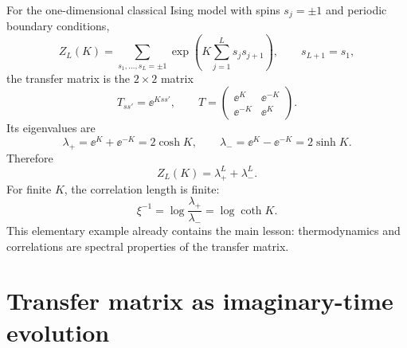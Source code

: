For the one-dimensional classical Ising model with spins $s_j=\pm1$ and periodic
boundary conditions,
\begin{equation}
\label{eq:classical-ising-1d-partition-function}
    Z_L(K)
    =
    \sum_{s_1,\ldots,s_L=\pm1}
    \exp\left(K\sum_{j=1}^{L}s_js_{j+1}\right),
    \qquad
    s_{L+1}=s_1,
\end{equation}
the transfer matrix is the $2\times2$ matrix
\begin{equation}
\label{eq:1d-ising-transfer-matrix}
    T_{ss'}=\ee^{Kss'},
    \qquad
    T=
    \begin{pmatrix}
        \ee^K & \ee^{-K} \\
        \ee^{-K} & \ee^K
    \end{pmatrix}.
\end{equation}
Its eigenvalues are
\begin{equation}
\label{eq:1d-ising-transfer-eigenvalues}
    \lambda_+=\ee^K+\ee^{-K}=2\cosh K,
    \qquad
    \lambda_- =\ee^K-\ee^{-K}=2\sinh K.
\end{equation}
Therefore
\begin{equation}
\label{eq:1d-ising-exact-partition-function}
    Z_L(K)=\lambda_+^L+\lambda_-^L.
\end{equation}
For finite $K$, the correlation length is finite:
\begin{equation}
\label{eq:1d-ising-correlation-length}
    \xi^{-1}
    =
    \log\frac{\lambda_+}{\lambda_-}
    =
    \log\coth K .
\end{equation}
This elementary example already contains the main lesson: thermodynamics and
correlations are spectral properties of the transfer matrix.

\section{Transfer matrix as imaginary-time evolution}
\label{sec:transfer-matrix-imaginary-time-evolution}

